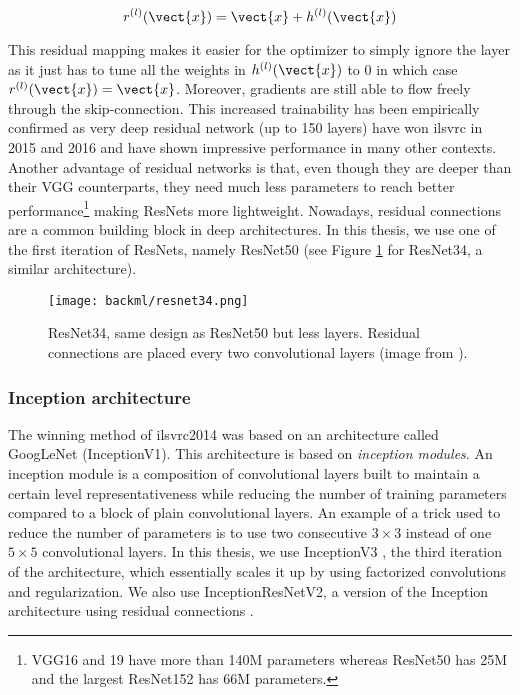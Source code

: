\begin{equation}
\label{eqn:backml:residual}
r^{(l)}(\vect{x}) = \vect{x} + h^{(l)}(\vect{x})
\end{equation}

This residual mapping makes it easier for the optimizer to simply ignore the layer
as it just has to tune all the weights in $h^{(l)}(\vect{x})$ to 0 in which case
$r^{(l)}(\vect{x}) = \vect{x}$. Moreover, gradients are still able to flow freely
through the skip-connection. This increased trainability has been empirically
confirmed as very deep residual network (up to 150 layers) have won \acrshort{ilsvrc}
in 2015 and 2016 and have shown impressive performance in many other contexts.
Another advantage of residual networks is that, even though they are deeper than
their VGG counterparts, they need much less parameters to reach better
performance\footnote{VGG16 and 19 have more than 140M parameters whereas ResNet50 has 25M and the largest ResNet152 has 66M parameters.}
making ResNets more lightweight. Nowadays, residual connections are a common
building block in deep architectures. In this thesis, we use one of the first
iteration of ResNets, namely ResNet50 (see Figure \ref{fig:backml:resnet} for
ResNet34, a similar architecture).

\begin{figure}
  \centering
  \texttt{[image: backml/resnet34.png]}
  \caption{ResNet34, same design as ResNet50 but less layers. Residual connections are placed every two convolutional layers (image from \parencite{he2016deep}).}
  \label{fig:backml:resnet}
\end{figure}

\subsubsection{Inception architecture}
\label{sssec:backml:arch:inception}
The winning method of \acrshort{ilsvrc}2014 was based on an architecture called
GoogLeNet \parencite{szegedy2015going} (\aka InceptionV1). This architecture is
based on \textit{inception modules}. An inception module is a composition of
convolutional layers built to maintain a certain level representativeness while
reducing the number of training parameters compared to a block of plain convolutional
layers. An example of a trick used to reduce the number of parameters is to use
two consecutive $3 \times 3$ instead of one $5 \times 5$ convolutional layers. In
this thesis, we use InceptionV3 \parencite{szegedy2016rethinking}, the third
iteration of the architecture, which essentially scales it up by using factorized
convolutions and regularization. We also use InceptionResNetV2, a version of the
Inception architecture using residual connections
\parencite{szegedy2017inception}.


